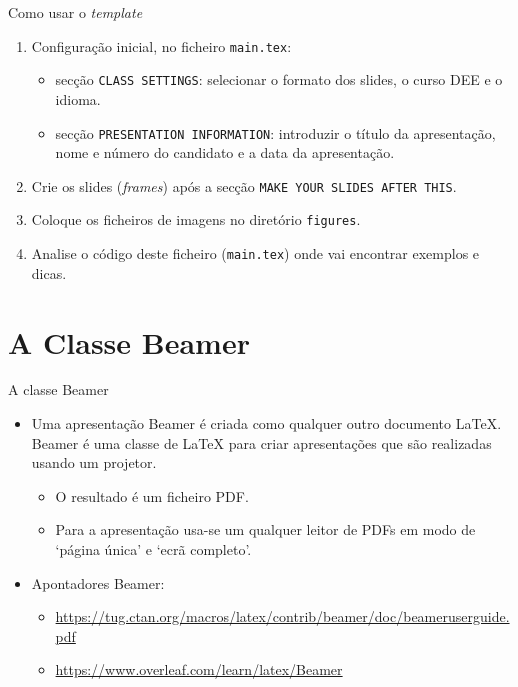 \documentclass[
aspectratio=169,	%
LEEC,				%
portuguese,			%
]{DEEclassP}
\begin{document}
\begin{frame}[fragile]{Como usar o \textit{template}}

\setlstep{0.3cm}{0cm}{0cm}
\begin{enumerate}
	\item Configuração inicial, no ficheiro \verb|main.tex|: 
	\begin{itemize}
		\item secção \verb|CLASS SETTINGS|: selecionar o formato dos slides, o curso DEE e o idioma.
		\item secção \verb|PRESENTATION INFORMATION|: introduzir o título da apresentação, nome e número do candidato e a data da apresentação.
	\end{itemize}	
	\item Crie os slides (\textit{frames}) após a secção \verb|MAKE YOUR SLIDES AFTER THIS|.
	\item Coloque os ficheiros de imagens no diretório \verb|figures|.
	\item Analise o código deste ficheiro (\verb|main.tex|) onde vai encontrar exemplos e dicas.
\end{enumerate}

\end{frame}

\section{A Classe Beamer}

\begin{frame}{A classe Beamer}

\setlstep{0.5cm}{0cm}{0cm}
\begin{itemize}
	\item Uma apresentação Beamer é criada como qualquer outro documento \LaTeX{}. Beamer é uma classe de \LaTeX{} para criar apresentações que são realizadas usando um projetor.
	\begin{itemize}
		\item O resultado é um ficheiro PDF.
		\item Para a apresentação usa-se um qualquer leitor de PDFs em modo de `página única' e `ecrã completo'.
	\end{itemize}	
	\item Apontadores Beamer:
	\begin{itemize}
		\item \url{https://tug.ctan.org/macros/latex/contrib/beamer/doc/beameruserguide.pdf}
		\item \url{https://www.overleaf.com/learn/latex/Beamer}
	\end{itemize}
\end{itemize}
\end{frame}
\end{document}

